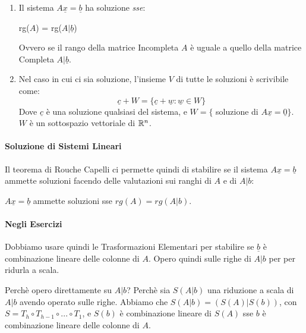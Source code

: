 \begin{enumerate}
	\item Il sistema $A\underline{x}=\underline{b}$ ha soluzione \emph{sse}:
	      \begin{center}
		      rg($A$) = rg($A|\underline{b}$)
	      \end{center}
	      Ovvero se il rango della matrice Incompleta $A$ è uguale a quello della matrice Completa $A|\underline{b}$.
	\item Nel caso in cui ci sia soluzione, l'insieme $V$ di tutte le soluzioni è scrivibile come:
	      \[ \underline{c} + W = \{ \underline{c} + \underline{w} : \underline{w} \in W\} \]
	      Dove $\underline{c}$ è una soluzione qualsiasi del sistema, e $W= \{$ soluzione di $A\underline{x} = \underline{0} \}$.
	      $W$ è un sottospazio vettoriale di $\mathbb{R}^n$.
\end{enumerate}

\paragraph{Soluzione di Sistemi Lineari}
Il teorema di Rouche Capelli ci permette quindi di stabilire se
il sistema $A\underline{x} =\underline{b}$ ammette soluzioni
facendo delle valutazioni sui ranghi di $A$ e di $A|b$:
\begin{center}
	$A\underline{x} =\underline{b}$ ammette soluzioni sse $rg(A) = rg(A|b)$.
\end{center}


\paragraph{Negli Esercizi}
Dobbiamo usare quindi le Trasformazioni Elementari per stabilire se $\underline{b}$ è combinazione lineare delle colonne di $A$.
Opero quindi sulle righe di $A|b$ per per ridurla a scala.

Perchè opero direttamente su $A|b$? Perchè sia $S(A|b)$ una riduzione a scala di $A|b$ avendo operato sulle righe.
Abbiamo che $S(A|b) = (S(A) | S(b))$, con $S= T_h \circ T_{h-1} \circ ... \circ T_1$, e $S(b)$ è combinazione lineare di $S(A)$ sse
$b$ è combinazione lineare delle colonne di $A$.


